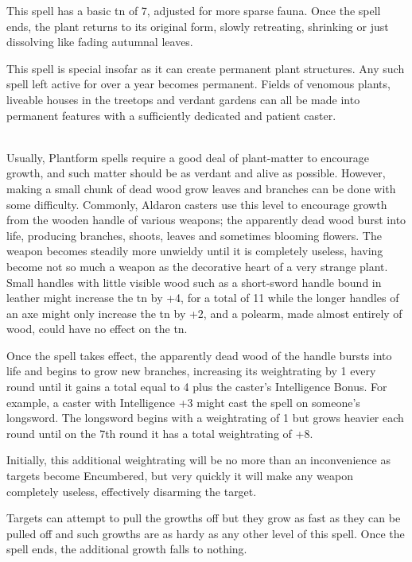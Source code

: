 \begin{multicols}{2}
This spell has a basic \gls{tn} of 7, adjusted for more sparse fauna. Once the spell ends, the plant returns to its original form, slowly retreating, shrinking or just dissolving like fading autumnal leaves.

This spell is special insofar as it can create permanent plant structures. Any such spell left active for over a year becomes permanent. Fields of venomous plants, liveable houses in the treetops and verdant gardens can all be made into permanent features with a sufficiently dedicated and patient caster.

\\
Usually, Plantform spells require a good deal of plant-matter to encourage growth, and such matter should be as verdant and alive as possible. However, making a small chunk of dead wood grow leaves and branches can be done with some difficulty. Commonly, Aldaron casters use this level to encourage growth from the wooden handle of various weapons; the apparently dead wood burst into life, producing branches, shoots, leaves and sometimes blooming flowers. The weapon becomes steadily more unwieldy until it is completely useless, having become not so much a weapon as the decorative heart of a very strange plant. Small handles with little visible wood such as a short-sword handle bound in leather might increase the \gls{tn} by +4, for a total of 11 while the longer handles of an axe might only increase the \gls{tn} by +2, and a polearm, made almost entirely of wood, could have no effect on the \gls{tn}.

Once the spell takes effect, the apparently dead wood of the handle bursts into life and begins to grow new branches, increasing its \gls{weightrating} by 1 every \gls{round} until it gains a total equal to 4 plus the caster's Intelligence Bonus.
For example, a caster with Intelligence +3 might cast the spell on someone's longsword. The longsword begins with a \gls{weightrating} of 1 but grows heavier each \gls{round} until on the 7th \gls{round} it has a total \gls{weightrating} of +8.

Initially, this additional \gls{weightrating} will be no more than an inconvenience as targets become Encumbered, but very quickly it will make any weapon completely useless, effectively disarming the target.

Targets can attempt to pull the growths off but they grow as fast as they can be pulled off and such growths are as hardy as any other level of this spell. Once the spell ends, the additional growth falls to nothing.


\end{multicols}
